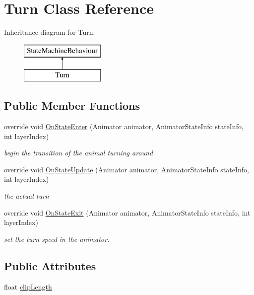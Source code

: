\hypertarget{class_turn}{}\section{Turn Class Reference}
\label{class_turn}
Inheritance diagram for Turn\+:\begin{figure}[H]
\begin{center}
\leavevmode
\includegraphics[height=2.000000cm]{class_turn}
\end{center}
\end{figure}
\subsection*{Public Member Functions}
\begin{DoxyCompactItemize}
\item 
override void \mbox{\hyperlink{class_turn_ab7818284eacb6044cc0bf2ecfb5865cd}{On\+State\+Enter}} (Animator animator, Animator\+State\+Info state\+Info, int layer\+Index)
\begin{DoxyCompactList}\small\item\em begin the transition of the animal turning around \end{DoxyCompactList}\item 
override void \mbox{\hyperlink{class_turn_a30c6736e71c06f23b98c69ec1982455c}{On\+State\+Update}} (Animator animator, Animator\+State\+Info state\+Info, int layer\+Index)
\begin{DoxyCompactList}\small\item\em the actual turn \end{DoxyCompactList}\item 
override void \mbox{\hyperlink{class_turn_a0a52b32577e9490557438452150198e7}{On\+State\+Exit}} (Animator animator, Animator\+State\+Info state\+Info, int layer\+Index)
\begin{DoxyCompactList}\small\item\em set the turn speed in the animator. \end{DoxyCompactList}\end{DoxyCompactItemize}
\subsection*{Public Attributes}
\begin{DoxyCompactItemize}
\item 
float \mbox{\hyperlink{class_turn_aa4ef3364b858cf37d1af92c7efe1024a}{clip\+Length}}
\end{DoxyCompactItemize}


